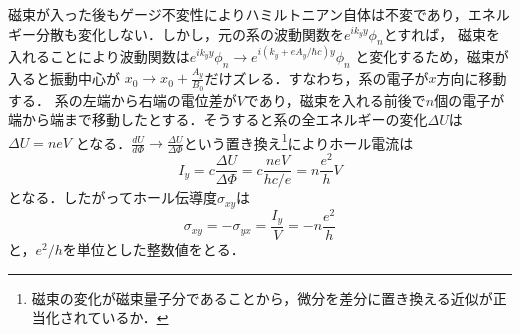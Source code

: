 \documentclass[]{jsarticle}
\begin{document}
\begin{comment}
次に具体的にハミルトニアンを見てみる．ランダウゲージ$\bm{A} = (0,B_0x,0)$を採用すれば，磁束を入れる前の系のハミルトニアンは
\begin{equation}
    H = \frac{1}{2m}\left\{p_x^2 + \left(p_y - \frac{eB_0x}{c} \right)^2 \right \},
\end{equation}
である．ハミルトニアンが$y$を含まないため$[H,p_y] = 0$であり，$p_y$の固有値を$\hbar k_y$とすれば
\begin{equation}
    H = \frac{1}{2m} p_x^2  + \frac{m}{2} \omega^2 \left(x - \frac{c \hbar k_y}{eB_0} \right)^2,
\end{equation}
$\omega = eB_0/mc$は振動数,$x_0 = c\hbar k_y /eB_0$は振動中心である．これは調和振動子のハミルトニアンであり，したがって系のエネルギー準位は
\begin{equation}
    E_n = \hbar \omega \left(n + \frac{1}{2} \right),
\end{equation}
と離散的に量子化されたランダウ準位となる．
\end{comment}
磁束が入った後もゲージ不変性によりハミルトニアン自体は不変であり，エネルギー分散も変化しない．しかし，元の系の波動関数を$e^{ik_y y}\phi_n$とすれば，
磁束を入れることにより波動関数は$e^{ik_y y} \phi_n \to e^{i(k_y + eA_y /\hbar c)y} \phi_n $ と変化するため，磁束が入ると振動中心が
$\displaystyle x_0 \to x_0 + \frac{A_y}{B_0} $だけズレる．すなわち，系の電子が$x$方向に移動する．
系の左端から右端の電位差が$V$であり，磁束を入れる前後で$n$個の電子が端から端まで移動したとする．そうすると系の全エネルギーの変化$\Delta U$は$\Delta U = neV$
となる．$\displaystyle \frac{dU}{d\Phi} \to \frac{\Delta U}{ \Delta \Phi}$という置き換え\footnote{磁束の変化が磁束量子分であることから，微分を差分に置き換える近似が正当化されているか．}によりホール電流は
\begin{equation}
    I_y = c\frac{\Delta U}{\Delta \Phi} = c\frac{neV}{hc/e} = n \frac{e^2}{h} V
\end{equation}
となる．したがってホール伝導度$\sigma_{xy}$は
\begin{equation}
    \sigma_{xy} = -\sigma_{yx} = \frac{I_y}{V} = -n\frac{e^2}{h}
\end{equation}
と，$e^2/h$を単位とした整数値をとる．

\end{document}
